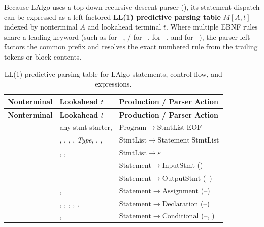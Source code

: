 Because LAlgo uses a top-down recursive-descent parser (), its statement dispatch can be expressed as a left-factored \textbf{LL(1) predictive parsing table} $M[A, t]$ indexed by nonterminal $A$ and lookahead terminal $t$. Where multiple EBNF rules share a leading keyword (such as  for --, / for --,  for --, and  for --), the parser left-factors the common prefix and resolves the exact numbered rule from the trailing tokens or block contents.

\begingroup
\small
\setlength{\LTpre}{4pt}
\setlength{\LTpost}{4pt}
\begin{longtable}{@{}L{28mm} L{46mm} L{82mm}@{}}
\caption{LL(1) predictive parsing table for LAlgo statements, control flow, and expressions.}
\label{tab:parsing-table} \\
\toprule
\textbf{Nonterminal} & \textbf{Lookahead $t$} & \textbf{Production / Parser Action} \\
\midrule
\endfirsthead
\toprule
\textbf{Nonterminal} & \textbf{Lookahead $t$} & \textbf{Production / Parser Action} \\
\midrule
\endhead
\bottomrule
\endfoot
{} & any stmt starter,  & $\mathrm{Program} \to \mathrm{StmtList}\;\mathrm{EOF}$ \\
 & , , , , \textit{Type}, , ,  & $\mathrm{StmtList} \to \mathrm{Statement}\;\mathrm{StmtList}$ \\
 & \codeinline{\}}, ,  & $\mathrm{StmtList} \to \varepsilon$ \\
 &  & $\mathrm{Statement} \to \mathrm{InputStmt}$ () \\
 &  & $\mathrm{Statement} \to \mathrm{OutputStmt}$ (--) \\
 & ,  & $\mathrm{Statement} \to \mathrm{Assignment}$ (--) \\
 & , , , , ,  & $\mathrm{Statement} \to \mathrm{Declaration}$ (--) \\
 & ,  & $\mathrm{Statement} \to \mathrm{Conditional}$ (--, ) \\

\end{longtable}
